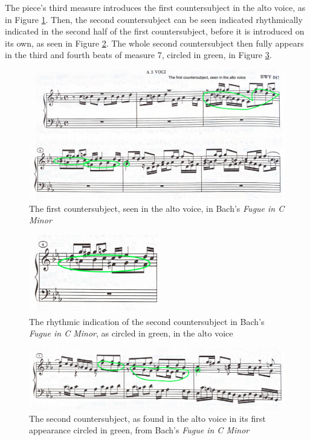 The piece's third measure introduces the first countersubject in the alto voice, as in Figure \ref{fig:bach-fugue-first-countersubject}\autocite{Henle_2009}. Then, the second countersubject can be seen indicated rhythmically indicated in the second half of the first countersubject, before it is introduced on its own, as seen in Figure \ref{fig:bach-fugue-second-cs-indication}\autocite{Henle_2009}. The whole second countersubject then fully appears in the third and fourth beats of measure 7, circled in green, in Figure \ref{fig:bach-fugue-second-countersubject}\autocite{Henle_2009}.

\begin{figure}
    \centering
    \includegraphics[width=\textwidth]{figures/bach-fugue-first-countersubject.jpg}
    \caption{The first countersubject, seen in the alto voice, in Bach's \textit{Fugue in C Minor}}
    \label{fig:bach-fugue-first-countersubject}
\end{figure}

\begin{figure}
    \centering
    \includegraphics[width=0.5\textwidth]{figures/bach-fugue-second-cs-indication.jpg}
    \caption{The rhythmic indication of the second countersubject in Bach's \textit{Fugue in C Minor}, as circled in green, in the alto voice}
    \label{fig:bach-fugue-second-cs-indication}
\end{figure}

\begin{figure}
    \centering
    \includegraphics[width=\textwidth]{figures/bach-fugue-second-countersubject.jpg}
    \caption{The second countersubject, as found in the alto voice in its first appearance circled in green, from Bach's \textit{Fugue in C Minor}}
    \label{fig:bach-fugue-second-countersubject}
\end{figure}


